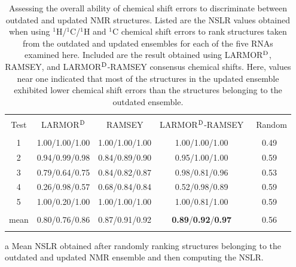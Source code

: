 \documentclass[fleqn,10pt]{wlscirep}
\begin{document}
\begin{table}[h]
\centering
\begin{threeparttable}
\begin{tabular}{c c c c c}
\hline
\\
Test  & LARMOR$^{\rm D}$ & RAMSEY &  LARMOR$^{\rm D}$-RAMSEY & \tnote{a} \ Random\\
\\
\hline
1 & 1.00/1.00/1.00 & 1.00/1.00/1.00 & 1.00/1.00/1.00 & 0.49 \\
2 & 0.94/0.99/0.98 & 0.84/0.89/0.90 & 0.95/1.00/1.00 & 0.59 \\
3 & 0.79/0.64/0.75 & 0.84/0.82/0.87 & 0.98/0.81/0.96 & 0.53 \\
4 & 0.26/0.98/0.57 & 0.68/0.84/0.84 & 0.52/0.98/0.89 & 0.59 \\
5 & 1.00/0.20/1.00 & 1.00/1.00/1.00 & 1.00/0.81/1.00 & 0.59 \\
\hline
\\
mean & 0.80/0.76/0.86 & 0.87/0.91/0.92 & \textbf{0.89}/\textbf{0.92}/\textbf{0.97}  & 0.56\\
\\
\hline
\end{tabular}
\begin{tablenotes}
\item[a] Mean NSLR obtained after randomly ranking structures belonging to the outdated and updated NMR ensemble and then computing the NSLR.
\end{tablenotes}
\end{threeparttable}
\caption{\label{tab:nslr} Assessing the overall ability of chemical shift errors to discriminate between outdated and updated NMR structures. Listed are the NSLR values obtained when using $^{1}$H/$^{1}$C/$^{1}$H and $^{1}$C chemical shift errors to rank structures taken from the outdated and updated ensembles for each of the five RNAs examined here. Included are the result obtained using LARMOR$^{\rm D}$, RAMSEY, and LARMOR$^{\rm D}$-RAMSEY consensus chemical shifts. Here, values near one indicated that most of the structures in the updated ensemble exhibited lower chemical shift errors than the structures belonging to the outdated ensemble. }
\end{table}
\end{document}
